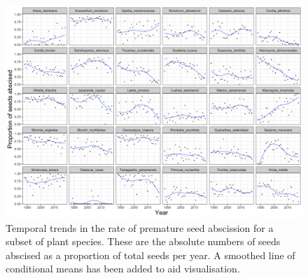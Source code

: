 \begin{figure}[!h]
\centering
\includegraphics[width=15cm]{yearBySp.png}
\caption{Temporal trends in the rate of premature seed abscission for a subset of plant species. These are the absolute numbers of seeds abscised as a proportion of total seeds per year. A smoothed line of conditional means has been added to aid visualisation.}
\label{fig:temporal}
\end{figure}